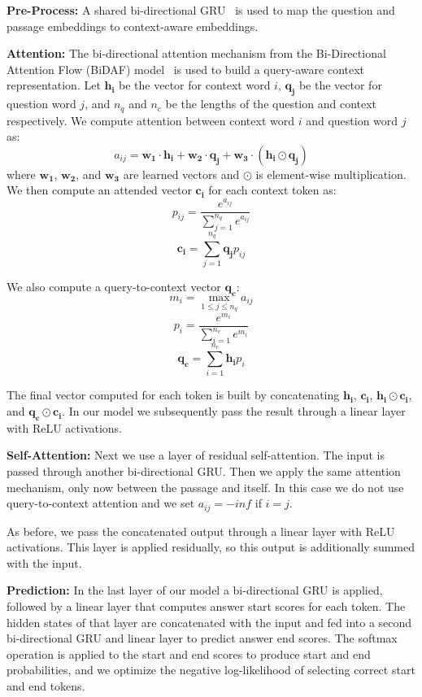 \documentclass[11pt,a4paper]{article}
\renewcommand{\vec}[1]{\mathbf{#1}}
\begin{document}
\textbf{Pre-Process:}
A shared bi-directional GRU~\cite{cho2014learning} is used to map the question and passage embeddings to context-aware embeddings. 

\textbf{Attention:}
The bi-directional attention mechanism from the Bi-Directional Attention Flow (BiDAF) model~\cite{bidaf} is used to build a query-aware context representation. Let $\vec{h_i}$ be the vector for context word $i$, $\vec{q_j}$ be the vector for question word $j$, and $n_q$ and $n_c$ be the lengths of the question and context respectively. We compute attention between context word $i$ and question word $j$ as:
%
$$ a_{ij} = \vec{w_1}\cdot \vec{h_i} + \vec{w_2} \cdot \vec{q_j} + \vec{w_3} \cdot( \vec{h_i} \odot \vec{q_j}) $$
where $\vec{w_1}$, $\vec{w_2}$, and $\vec{w_3}$ are learned vectors and $\odot$ is element-wise multiplication. We then compute an attended vector $\vec{c_i}$ for each context token as:
%
$$ p_{ij} = \frac{e^{a_{ij}}}{\sum^{n_q}_{j=1}e^{a_{ij}}} $$
$$ \vec{c_i} = \sum^{n_q}_{j=1} \vec{q_j} p_{ij}$$

We also compute a query-to-context vector $\vec{q_c}$:
$$ m_i = \max_{1 \leq j \le n_q} a_{ij}$$
$$ p_i = \frac{e^{m_{i}}}{\sum^{n_c}_{i=1}e^{m_{i}}}$$
$$ \vec{q_c} = \sum^{n_c}_{i=1} \vec{h_i} p_i$$

The final vector computed for each token is built by concatenating $\vec{h_i}$, $\vec{c_i}$, $\vec{h_i} \odot \vec{c_i}$, and $\vec{q_c} \odot \vec{c_i}$. In our model we subsequently pass the result through a linear layer with ReLU activations.

\textbf{Self-Attention:}
Next we use a layer of residual self-attention. The input is passed through another bi-directional GRU. Then we apply the same attention mechanism, only now between the passage and itself. In this case we do not use query-to-context attention and we set $a_{ij} = -inf$ if $i = j$.

As before, we pass the concatenated output through a linear layer with ReLU activations. This layer is applied residually, so this output is additionally summed with the input.

\textbf{Prediction:}
In the last layer of our model a bi-directional GRU is applied, followed by a linear layer that computes answer start scores for each token. The hidden states of that layer are concatenated with the input and fed into a second bi-directional GRU and linear layer to predict answer end scores. The softmax operation is applied to the start and end scores to produce start and end probabilities, and we optimize the negative log-likelihood of selecting correct start and end tokens.
\end{document}
